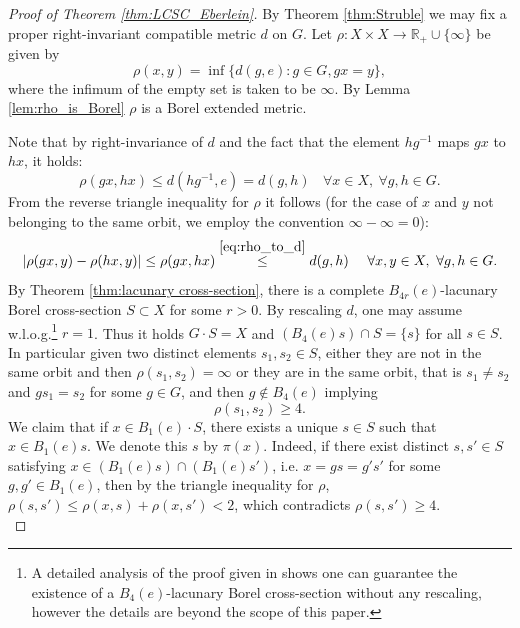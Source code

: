 \documentclass[11pt]{article}
\theoremstyle{plain}
\theoremstyle{definition}
\def\R{\mathbb{R}}
\numberwithin{figure}{section}
\begin{document}
\begin{proof}[Proof of Theorem \ref{thm:LCSC_Eberlein}]
By Theorem \ref{thm:Struble}  we may fix a proper right-invariant compatible metric  $d$ on $G$. 
    Let $\rho: X\times X\to\R_+\cup\{\infty\}$ be given by
    \begin{equation*}
        \rho(x,y)=\inf\{d(g,e): g\in G,gx=y\},
    \end{equation*}
    where the infimum of the empty set is taken to be $\infty$. By Lemma \ref{lem:rho_is_Borel} $\rho$ is a  Borel extended metric.    
    
    
    Note that by right-invariance of $d$ and the fact that the element $hg^{-1}$ maps $gx$ to $hx$, it holds: 
    \begin{equation}\label{eq:rho_to_d}
      \rho(gx,hx)\leq d(hg^{-1},e)= d(g,h) ~~~~\forall x\in X,~\forall g,h\in G.
    \end{equation}
From the reverse triangle inequality for $\rho$ it follows (for the case of $x$ and $y$ not belonging to the same orbit, we employ the convention $\infty-\infty=0$):
    \begin{equation}\label{Lipschitz diatance}
        |\rho(gx,y)-\rho(hx,y)|\leq \rho(gx,hx) \stackrel{\eqref{eq:rho_to_d}}{\leq} d(g,h) ~~~~\forall x,y\in X,~\forall g,h\in G.
    \end{equation}
    By Theorem \ref{thm:lacunary cross-section}, there is a complete $B_{4r}(e)$-lacunary Borel cross-section $S\subset X$ for some $r>0$. By rescaling $d$, one may assume w.l.o.g.\footnote{A detailed analysis of the proof given in \cite{Kechris1992} shows one can guarantee the existence of a $B_{4}(e)$-lacunary Borel cross-section  without any rescaling, however the details are beyond the scope of this paper.} $r=1$.  Thus it holds  $G\cdot S=X$ and $(B_{4}(e) s)\cap S=\{s\}$ for all $s\in S$. In particular given two distinct elements $s_1,s_2\in S$, either they are not in the same orbit and then $\rho(s_1,s_2)=\infty$ or they are in the same orbit, that is $s_1\neq s_2$ and $gs_1=s_2$ for some $g\in G$, and then $g\notin B_{4}(e)$ implying 
    \begin{equation}\label{eq:distinct_s}
       \rho(s_1,s_2)\geq 4.
    \end{equation}
     We claim that if $x\in B_1(e)\cdot S$, there exists a unique $s\in S$ such that $x\in B_1(e) s$. We denote this $s$ by $\pi(x)$. Indeed, if there exist distinct $s,s'\in S$ satisfying $x\in (B_1(e) s)\cap(B_1(e) s')$, i.e. $x=gs=g's'$ for some $g,g'\in B_1(e)$, then by the triangle inequality for $\rho$, $\rho(s,s')\leq \rho(x,s)+\rho(x,s')<2$, which contradicts $\rho(s,s')\geq 4$.\\

\end{proof}
\end{document}
